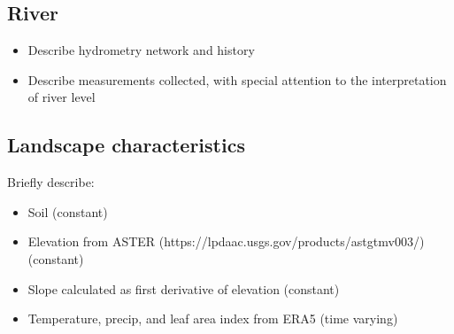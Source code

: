 \subsection{River}
\begin{itemize}
    \item Describe hydrometry network and history
    \item Describe measurements collected, with special attention to the interpretation of river level
\end{itemize}

\subsection{Landscape characteristics}

Briefly describe: 

\begin{itemize}
    \item Soil (constant)
    \item Elevation from ASTER (https://lpdaac.usgs.gov/products/astgtmv003/)  (constant)
    \item Slope calculated as first derivative of elevation (constant)
    \item Temperature, precip, and leaf area index from ERA5 (time varying)
\end{itemize}

